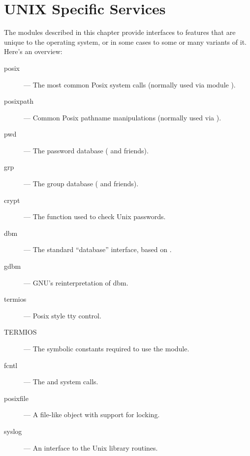 \chapter{UNIX Specific Services}

The modules described in this chapter provide interfaces to features
that are unique to the \UNIX{} operating system, or in some cases to
some or many variants of it.  Here's an overview:

\begin{description}

\item[posix]
--- The most common Posix system calls (normally used via module ).

\item[posixpath]
--- Common Posix pathname manipulations (normally used via ).

\item[pwd]
--- The password database ( and friends).

\item[grp]
--- The group database ( and friends).

\item[crypt]
--- The  function used to check Unix passwords.

\item[dbm]
--- The standard ``database'' interface, based on .

\item[gdbm]
--- GNU's reinterpretation of dbm.

\item[termios]
--- Posix style tty control.

\item[TERMIOS]
--- The symbolic constants required to use the  module.

\item[fcntl]
--- The  and  system calls.

\item[posixfile]
--- A file-like object with support for locking.

\item[syslog]
--- An interface to the Unix  library routines.

\end{description}
